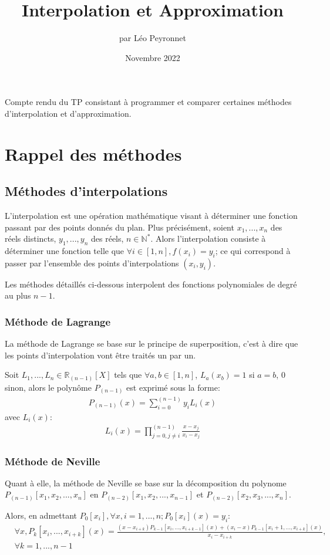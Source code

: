 \documentclass[10pt,a4paper,french]{article}
\author{par Léo Peyronnet}
\title{Interpolation et Approximation}
\date{Novembre 2022}
\begin{document}
\maketitle
Compte rendu du TP consistant à programmer et comparer certaines méthodes d'interpolation et d'approximation.
\section{Rappel des méthodes}
\subsection{Méthodes d'interpolations}
L'interpolation est une opération mathématique visant à déterminer une fonction passant par des points donnés du plan. Plus précisément, soient $x_1,...,x_n$ des réels distincts, $y_1,...,y_n$ des réels, $n \in \mathbb{N^*}$. Alors l'interpolation consiste à déterminer une fonction telle que $\forall i \in [1,n],f(x_i)=y_i$; ce qui correspond à passer par l'ensemble des points d'interpolations $(x_i,y_i)$.

Les méthodes détaillés ci-dessous interpolent des fonctions polynomiales de degré au plus $n-1$.
\subsubsection{Méthode de Lagrange}
La méthode de Lagrange se base sur le principe de superposition, c'est à dire que les points d'interpolation vont être traités un par un.

Soit $L_1,...,L_n \in \mathbb{R}_{(n-1)}[X]$ tels que $\forall a,b \in [1,n]$, $L_a(x_b)=1$ si $a=b$, $0$ sinon, alors le polynôme $P_{(n-1)}$ est exprimé sous la forme:
\begin{align*}
P_{(n-1)}(x)=\sum_{i=0}^{(n-1)}y_i L_i(x)
\end{align*}
avec $L_i(x)$:
\begin{align*}
L_i(x)=\prod_{j=0,j\neq i}^{(n-1)}\frac{x-x_j}{x_i-x_j}
\end{align*}
\subsubsection{Méthode de Neville}
Quant à elle, la méthode de Neville se base sur la décomposition du polynome $P_{(n-1)}[x_1,x_2,...,x_n]$ en $P_{(n-2)}[x_1,x_2,...,x_{n-1}]$ et $P_{(n-2)}[x_2,x_3,...,x_{n}]$.

Alors, en admettant $P_0[x_i],\forall x,i=1,...,n ; P_0[x_i](x)=y_i$:
{\tiny
\begin{align*}
&\forall x,P_{k}[x_i,...,x_{i+k}](x)=\frac{(x-x_{i+k})P_{k-1}[x_i,...,x_{i+k-1}](x)+(x_i-x)P_{k-1}[x_i+1,...,x_{i+k}](x)}{x_i-x_{i+k}},\\&\forall k=1,...,n-1
\end{align*}
}
\end{document}
